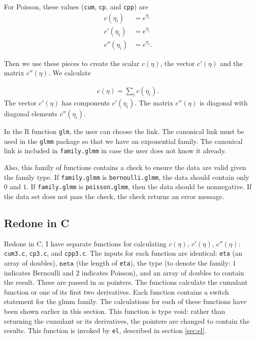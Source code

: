 \documentclass{article}
\begin{document}
 For Poisson, these values (\texttt{cum}, \texttt{cp}, and \texttt{cpp}) are
\begin{align}
c(\eta_i)&=e^{\eta_i}\\
c'(\eta_i)&=e^{{\eta_{i}}}\\
c''(\eta_i)&= e^{{\eta_{i}}}.
\end{align}



Then we use these pieces to create the scalar $c(\eta)$, the vector $c'(\eta)$ and the matrix $c''(\eta)$. We calculate

\begin{align}
c(\eta)= \sum_i c(\eta_i).
\end{align}
 The vector $c'(\eta)$ has components $c'(\eta_i)$. The matrix $c''(\eta)$ is diagonal with diagonal elements $c''(\eta_i)$.

In the R function \texttt{glm}, the user can choose the link. The canonical link must be used in the \texttt{glmm} package so that we have an exponential family. The canonical link is included in \texttt{family.glmm}  in case the user does not know it already.

Also, this family of functions contains a check to ensure the data are valid given the family type. If \texttt{family.glmm} is \texttt{bernoulli.glmm}, the data should contain only $0$ and $1$. If \texttt{family.glmm} is \texttt{poisson.glmm}, then the data should be nonnegative.  If the data set does not pass the check, the check returns an error message. 

\subsection{Redone in C}
Redone in C, I  have  separate functions for calculating $c(\eta)$, $c'(\eta)$, $c''(\eta)$: \texttt{cum3.c}, \texttt{cp3.c}, and \texttt{cpp3.c}. The inputs for each function are identical:  \texttt{eta} (an array of doubles), $\texttt{neta}$ (the length of \texttt{eta}), the type (to denote the family: $1$ indicates Bernoulli and $2$ indicates Poisson), and an array of doubles to contain the result. These are passed in as pointers. The functions  calculate  the cumulant function or one of its first two derivatives. Each function  contains a switch statement for the glmm family. The calculations for each of these functions have  been shown earlier in this section. This function is type void: rather than returning the cumulant or its derivatives, the pointers are changed to contain the results. This function is invoked by \texttt{el}, described in section \ref{sec:el}.
\end{document}

